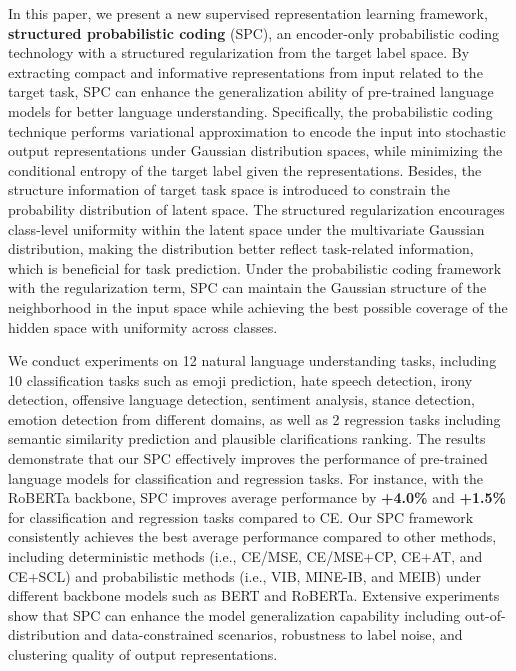\documentclass[letterpaper]{article} %
\begin{document}
In this paper, we present a new supervised representation learning framework, \textbf{structured probabilistic coding} (SPC), an encoder-only probabilistic coding technology with a structured regularization from the target label space. By extracting compact and informative representations from input related to the target task, SPC can enhance the generalization ability of pre-trained language models for better language understanding. 
Specifically, the probabilistic coding technique performs variational approximation to encode the input into stochastic output representations under Gaussian distribution spaces, while minimizing the conditional entropy of the target label given the representations.
Besides, the structure information of target task space is introduced to constrain the probability distribution of latent space. 
The structured regularization encourages class-level uniformity within the latent space under the multivariate Gaussian distribution, making the distribution better reflect task-related information, which is beneficial for task prediction.
Under the probabilistic coding framework with the regularization term, SPC can maintain the Gaussian structure of the neighborhood in the input space while achieving the best possible coverage of the hidden space with uniformity across classes.


We conduct experiments on 12 natural language understanding tasks, including 10 classification tasks such as emoji prediction, hate speech detection, irony detection, offensive language detection, sentiment analysis, stance detection, emotion detection from different domains, as well as 2 regression tasks including semantic similarity prediction and plausible clarifications ranking. The results demonstrate that our SPC effectively improves the performance of pre-trained language models for classification and regression tasks. For instance, with the RoBERTa backbone, SPC improves average performance by \textbf{+4.0\%} and \textbf{+1.5\%} for classification and regression tasks compared to CE. Our SPC framework consistently achieves the best average performance compared to other methods, including deterministic methods (i.e., CE/MSE, CE/MSE+CP, CE+AT, and CE+SCL) and probabilistic methods (i.e., VIB, MINE-IB, and MEIB) 
under different backbone models such as BERT and RoBERTa. Extensive experiments show that SPC can enhance the model generalization capability including out-of-distribution and data-constrained scenarios, robustness to label noise, and clustering quality of output representations.
\end{document}

